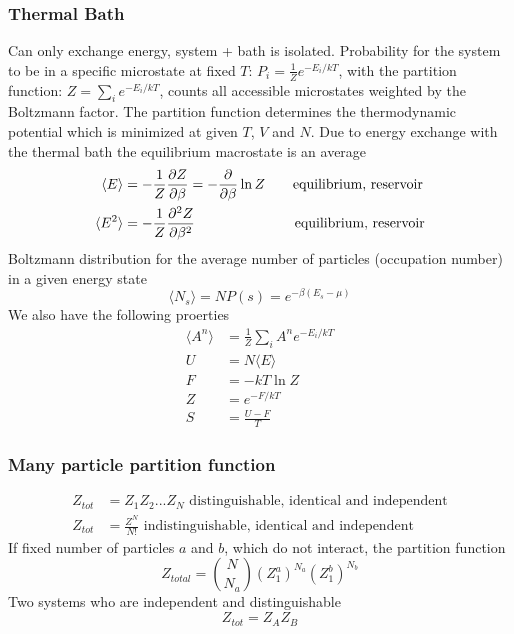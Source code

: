 \documentclass[a4paper, norsk, 8pt]{article}
\begin{document}
\begin{multicols*}{3}
\subsubsection*{\scriptsize Thermal Bath}
Can only exchange energy, system + bath is isolated. Probability for the system to be in a specific microstate at fixed $T$: $P_i = \frac{1}{Z}e^{-E_i/kT}$, with the partition function: $Z = \sum_{i} e^{-E_i/kT}$, counts all accessible microstates weighted by the Boltzmann factor. The partition function determines the thermodynamic potential which is minimized at given $T$, $V$ and $N$. Due to energy exchange with the thermal bath the equilibrium macrostate is an average
\begin{align*}
  \langle E \rangle &= -\frac{1}{Z}\pdv{Z}{\beta}  = -\pdv{}{\beta}\ln{Z}\qquad \text{equilibrium, reservoir}\\
  \langle E^2 \rangle &= -\frac{1}{Z}\pdv[2]{Z}{\beta}\quad \qquad \qquad \qquad \,\text{equilibrium, reservoir}
\end{align*}
Boltzmann distribution for the average number of particles (occupation number) in a given energy state
\begin{equation*}
  \langle N_s \rangle = NP(s) = e^{-\beta(E_s-\mu)}
\end{equation*}
We also have the following proerties
\begin{align*}
    \langle A^n \rangle &= \frac{1}{Z}\sum_{i} A^n e^{-E_i/kT} \\
    U &= N\langle E \rangle  \\
    F &= -kT\ln{Z} \\
    Z &= e^{-F/kT} \\
    S &= \frac{U-F}{T}
\end{align*}
\subsubsection*{\scriptsize Many particle partition function}
\begin{align*}
  Z_{tot} &= Z_1Z_2...Z_N\,\, \text{distinguishable, identical and independent}\\
  Z_{tot} &= \frac{Z^N}{N!}\,\, \text{indistinguishable, identical and independent }
\end{align*}
If fixed number of particles $a$ and $b$, which do not interact, the partition function
\begin{equation*}
  Z_{total} = \binom{N}{N_a}(Z_1^a)^{N_a}(Z_1^b)^{N_b}
\end{equation*}
Two systems who are independent and distinguishable
$$Z_{tot} = Z_AZ_B $$

\end{multicols*}
\end{document}
